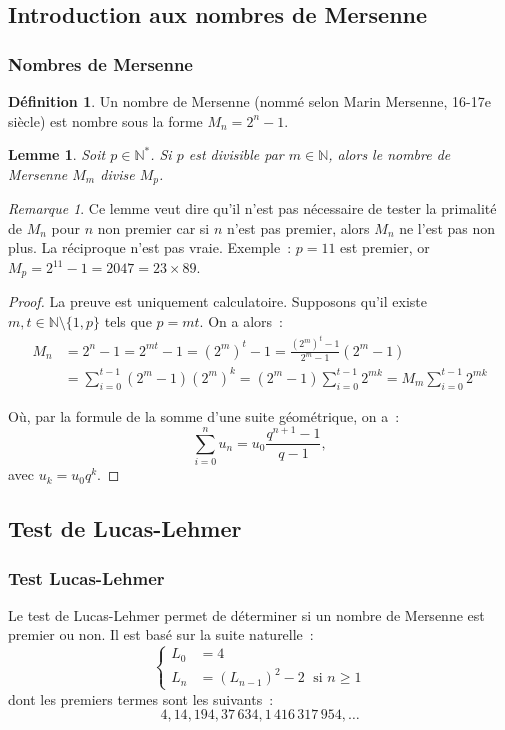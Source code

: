\documentclass[10pt, mathserif]{beamer}
\newcommand{\N}{\mathbb N}
\newtheorem{lem}[thm]{Lemme}
\theoremstyle{definition}
\newtheorem{déf}[thm]{Définition}
\theoremstyle{remark}
\newtheorem*{rmq}{Remarque}
\begin{document}
	\subsection{Introduction aux nombres de Mersenne}
	\begin{frame}
		\frametitle{Nombres de Mersenne}
		\begin{déf}
			Un nombre de Mersenne (nommé selon Marin Mersenne, 16-17e siècle) est nombre sous la forme $M_n = 2^n-1$.
		\end{déf}

		\begin{lem}
			Soit $p \in \N^*$. Si $p$ est divisible par $m \in \N$, alors le nombre de Mersenne $M_m$ divise $M_p$.
		\end{lem}

		\begin{rmq}
			Ce lemme veut dire qu'il n'est pas nécessaire de tester la primalité de $M_n$ pour $n$ non premier car si $n$ n'est pas premier, alors $M_n$ ne
			l'est pas non plus. La réciproque n'est pas vraie. Exemple~: $p = 11$ est premier, or $M_p = 2^{11}-1 = 2047 = 23 \times 89$.
		\end{rmq}
	\end{frame}

	\begin{frame}
		\begin{proof}
			La preuve est uniquement calculatoire. Supposons qu'il existe $m, t \in \N \setminus \{1, p\}$ tels que $p = mt$. On a alors~:
			\[\begin{aligned}
				M_n &= 2^n-1
				    = 2^{mt}-1
				    = \left(2^m\right)^t - 1
					= \frac {\left(2^m\right)^t - 1}{2^m - 1}\left(2^m - 1\right) \\
					&= \sum_{i=0}^{t-1}\left(2^m - 1\right)\left(2^m\right)^k
					= \left(2^m-1\right)\sum_{i=0}^{t-1}2^{mk}
					= M_m\sum_{i=0}^{t-1}2^{mk}
			\end{aligned}\]

			Où, par la formule de la somme d'une suite géométrique, on a~:
			\[\sum_{i=0}^{n}u_n = u_0\frac {q^{n+1}-1}{q-1},\]
			avec $u_k = u_0q^k$.
		\end{proof}
	\end{frame}

	\subsection{Test de Lucas-Lehmer}
	\begin{frame}
		\frametitle{Test Lucas-Lehmer}
		Le test de Lucas-Lehmer permet de déterminer si un nombre de Mersenne est premier ou non. Il est basé sur la suite naturelle~:
		\[\begin{cases}
			L_0 &= 4 \\
			L_n &= (L_{n-1})^2 - 2 \;\text{ si } n \geq 1
		\end{cases}\]
		dont les premiers termes sont les suivants~:
		\[4, 14, 194, 37\,634, 1\,416\,317\,954, \ldots\]
	\end{frame}
\end{document}
